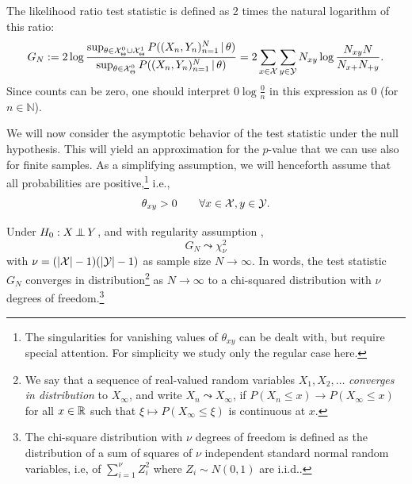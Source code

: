 The likelihood ratio test statistic is defined as 2 times the natural logarithm of this ratio:
\begin{equation}\label{eq:G_test_statistic}
  G_N := 2 \log \frac{\sup_{\theta\in\mathcal{X}_\Theta^0\cup\mathcal{X}_\Theta^1} P((X_n,Y_n)_{n=1}^N \operatorname*{|} \theta)}{\sup_{\theta\in\mathcal{X}_\Theta^0} P((X_n,Y_n)_{n=1}^N \operatorname*{|} \theta)} = 2 \sum_{x\in\mathcal{X}} \sum_{y\in\mathcal{Y}} N_{xy} \log \frac{N_{xy} N}{N_{x+} N_{+ y}}.
\end{equation}
Since counts can be zero, one should interpret $0 \log \frac{0}{n}$ in this expression as $0$ (for $n \in \mathbb{N}$).

We will now consider the asymptotic behavior of the test statistic under the null hypothesis.
This will yield an approximation for the $p$-value that we can use also for finite samples.
As a simplifying assumption, we will henceforth assume that all probabilities are positive,\footnote{The singularities for vanishing values of $\theta_{xy}$ can be dealt with, but require special attention. For simplicity we study only the regular case here.} i.e.,
\begin{equation}\label{eq:G_test_regularity}
  \theta_{xy} > 0 \qquad \forall x \in \mathcal{X}, y\in \mathcal{Y}.
\end{equation}
\begin{Prp}\label{prp:G_test_asymptotics_H0}
Under $H_0 : X \operatorname*{\perp\mkern-11mu\perp} Y$, and with regularity assumption ,
$$G_N \leadsto \chi_\nu^2$$
with $\nu = (|\mathcal{X}| - 1)(|\mathcal{Y}| - 1)$ as sample size $N \to \infty$.
  In words, the test statistic $G_N$ converges in distribution\footnote{We say that a sequence of real-valued random variables $X_1,X_2,\dots$ \emph{converges in distribution} to $X_\infty$, and write $X_n \leadsto X_\infty$, if $P(X_n \le x) \to P(X_\infty \le x)$ for all $x \in \mathbb{R}$ such that $\xi \mapsto P(X_\infty \le \xi)$ is continuous at $x$.} as $N \to \infty$ to a chi-squared distribution with $\nu$ degrees of freedom.\footnote{The chi-square distribution with $\nu$ degrees of freedom is defined as the distribution of a sum of squares of $\nu$ independent standard normal random variables, i.e, of $\sum_{i=1}^\nu Z_i^2$ where $Z_i \sim N(0,1)$ are i.i.d..}
\end{Prp}
